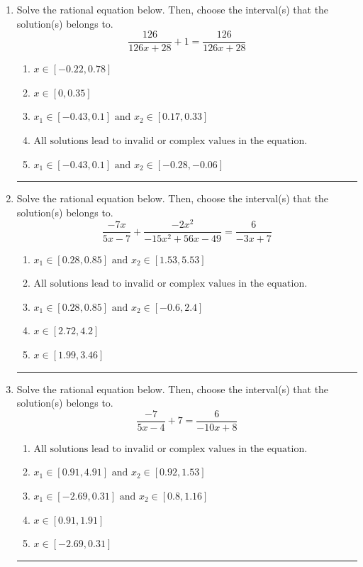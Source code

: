 \documentclass[14pt]{extbook}
\newcommand{\litem}[1]{\item#1\hspace*{-1cm}\rule{\textwidth}{0.4pt}}
\begin{document}
\begin{enumerate}
{\begin{enumerate}[label=\Alph*.]
\end{enumerate} }
\litem{
Solve the rational equation below. Then, choose the interval(s) that the solution(s) belongs to.\[ \frac{126}{126x + 28} + 1 = \frac{126}{126x + 28} \]\begin{enumerate}[label=\Alph*.]
\item \( x \in [-0.22,0.78] \)
\item \( x \in [0,0.35] \)
\item \( x_1 \in [-0.43, 0.1] \text{ and } x_2 \in [0.17,0.33] \)
\item \( \text{All solutions lead to invalid or complex values in the equation.} \)
\item \( x_1 \in [-0.43, 0.1] \text{ and } x_2 \in [-0.28,-0.06] \)

\end{enumerate} }
\litem{
Solve the rational equation below. Then, choose the interval(s) that the solution(s) belongs to.\[ \frac{-7x}{5x -7} + \frac{-2x^{2}}{-15x^{2} +56 x -49} = \frac{6}{-3x + 7} \]\begin{enumerate}[label=\Alph*.]
\item \( x_1 \in [0.28, 0.85] \text{ and } x_2 \in [1.53,5.53] \)
\item \( \text{All solutions lead to invalid or complex values in the equation.} \)
\item \( x_1 \in [0.28, 0.85] \text{ and } x_2 \in [-0.6,2.4] \)
\item \( x \in [2.72,4.2] \)
\item \( x \in [1.99,3.46] \)

\end{enumerate} }
\litem{
Solve the rational equation below. Then, choose the interval(s) that the solution(s) belongs to.\[ \frac{-7}{5x -4} + 7 = \frac{6}{-10x + 8} \]\begin{enumerate}[label=\Alph*.]
\item \( \text{All solutions lead to invalid or complex values in the equation.} \)
\item \( x_1 \in [0.91, 4.91] \text{ and } x_2 \in [0.92,1.53] \)
\item \( x_1 \in [-2.69, 0.31] \text{ and } x_2 \in [0.8,1.16] \)
\item \( x \in [0.91,1.91] \)
\item \( x \in [-2.69,0.31] \)

\end{enumerate} }
\end{enumerate}
\end{document}

